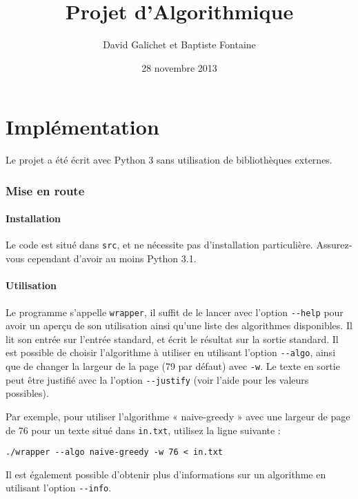 \documentclass[a4paper, 11pt]{article}
\begin{document}
\title{Projet d'Algorithmique}
\author{David Galichet et Baptiste Fontaine}
\date{28 novembre 2013}
\maketitle
\tableofcontents
\newpage


\part{Implémentation}

Le projet a été écrit avec Python 3 sans utilisation de bibliothèques externes.

\section{Mise en route}
\subsection{Installation}

Le code est situé dans \verb|src|, et ne nécessite pas d'installation
particulière. Assurez-vous cependant d'avoir au moins Python 3.1.

\subsection{Utilisation}

Le programme s'appelle \verb|wrapper|, il suffit de le lancer avec l'option
\verb|--help| pour avoir un aperçu de son utilisation ainsi qu'une liste des
algorithmes disponibles. Il lit son entrée sur l'entrée standard, et écrit le
résultat sur la sortie standard. Il est possible de choisir l'algorithme à
utiliser en utilisant l'option \verb|--algo|, ainsi que de changer la largeur
de la page (79 par défaut) avec \verb|-w|. Le texte en sortie peut être
justifié avec la l'option \verb|--justify| (voir l'aide pour les valeurs
possibles).

Par exemple, pour utiliser l'algorithme « naive-greedy » avec une largeur de
page de 76 pour un texte situé dans \verb|in.txt|, utilisez la ligne suivante :

\begin{verbatim}
./wrapper --algo naive-greedy -w 76 < in.txt
\end{verbatim}

Il est également possible d'obtenir plus d'informations sur un algorithme en
utilisant l'option \verb|--info|.
\end{document}
